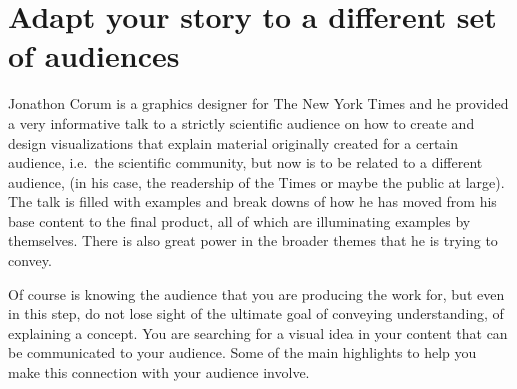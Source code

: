 \documentclass[]{book}
\theoremstyle{definition}
\theoremstyle{definition}
\theoremstyle{definition}
\theoremstyle{remark}
\begin{document}
\section{Adapt your story to a different set of
audiences}\label{adapt-your-story-to-a-different-set-of-audiences}

Jonathon Corum is a graphics designer for The New York Times and he
provided a very informative talk to a strictly scientific audience on
how to create and design visualizations that explain material originally
created for a certain audience, i.e.~the scientific community, but now
is to be related to a different audience, (in his case, the readership
of the Times or maybe the public at large). The talk is filled with
examples and break downs of how he has moved from his base content to
the final product, all of which are illuminating examples by themselves.
There is also great power in the broader themes that he is trying to
convey.

Of course is knowing the audience that you are producing the work for,
but even in this step, do not lose sight of the ultimate goal of
conveying understanding, of explaining a concept. You are searching for
a visual idea in your content that can be communicated to your audience.
Some of the main highlights to help you make this connection with your
audience involve.
\end{document}

